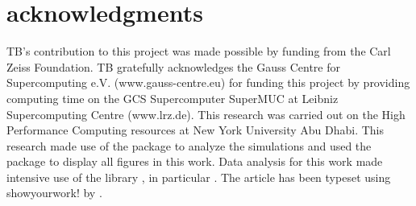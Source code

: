 \documentclass[useAMS,usenatbib]{mnras}
\begin{document}
\section*{acknowledgments}
TB's contribution to this project was made possible by funding from the Carl Zeiss Foundation. TB gratefully acknowledges the Gauss Centre for Supercomputing e.V. (www.gauss-centre.eu) for funding this project by providing computing time on the GCS Supercomputer SuperMUC at Leibniz Supercomputing Centre (www.lrz.de). This research was carried out on the High Performance Computing resources at New York University Abu Dhabi.
This research made use of the {} \citet{pynbody} package to analyze the simulations and used the {} package {} \citep{matplotlib} to display all figures in this work. Data analysis for this work made intensive use of the {} library {} \citep{scipy}, in particular {} \citep{numpy,ipython}. The article has been typeset using showyourwork! by \citet{Luger2021}.






\label{lastpage}
\end{document}
